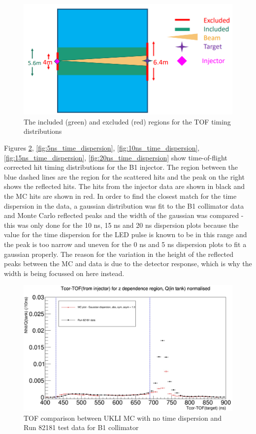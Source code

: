 \begin{figure}
    \centering
    \includegraphics[width=\textwidth]{Figures/exclusion_region.PNG}
    \caption{The included (green) and excluded (red) regions for the TOF timing distributions}
    \label{fig:exclusion_region}
\end{figure}

Figures \ref{fig:0ns_time_dispersion}, \ref{fig:5ns_time_dispersion}, \ref{fig:10ns_time_dispersion}, \ref{fig:15ns_time_dispersion}, \ref{fig:20ns_time_dispersion} show time-of-flight corrected hit timing distributions for the B1 injector. The region between the blue dashed lines are the region for the scattered hits and the peak on the right shows the reflected hits. The hits from the injector data are shown in black and the MC hits are shown in red. In order to find the closest match for the time dispersion in the data, a gaussian distribution was fit to the B1 collimator data and Monte Carlo reflected peaks and the width of the gaussian was compared - this was only done for the 10 ns, 15 ns and 20 ns dispersion plots because the value for the time dispersion for the LED pulse is known to be in this range and the peak is too narrow and uneven for the 0 ns and 5 ns dispersion plots to fit a gaussian properly. The reason for the variation in the height of the reflected peaks between the MC and data is due to the detector response, which is why the width is being focussed on here instead.

\begin{figure}
    \centering
    \includegraphics[width=\textwidth]{Figures/0ns_gaussian_dispersion_comparison.jpg}
    \caption{TOF comparison between UKLI MC with no time dispersion and Run 82181 test data for B1 collimator}
    \label{fig:0ns_time_dispersion}
\end{figure}

